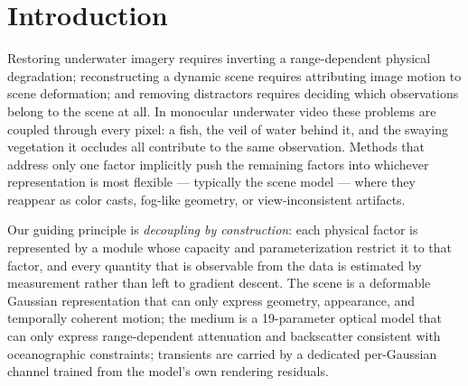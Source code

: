 \documentclass[11pt,a4paper]{article}
\begin{document}
\section{Introduction}

Restoring underwater imagery requires inverting a range-dependent physical degradation; reconstructing a dynamic scene requires attributing image motion to scene deformation; and removing distractors requires deciding which observations belong to the scene at all. In monocular underwater video these problems are coupled through every pixel: a fish, the veil of water behind it, and the swaying vegetation it occludes all contribute to the same observation. Methods that address only one factor implicitly push the remaining factors into whichever representation is most flexible --- typically the scene model \cite{mildenhall2020nerf,kerbl20233d} --- where they reappear as color casts, fog-like geometry, or view-inconsistent artifacts.

Our guiding principle is \emph{decoupling by construction}: each physical factor is represented by a module whose capacity and parameterization restrict it to that factor, and every quantity that is observable from the data is estimated by measurement rather than left to gradient descent. The scene is a deformable Gaussian representation that can only express geometry, appearance, and temporally coherent motion; the medium is a 19-parameter optical model that can only express range-dependent attenuation and backscatter consistent with oceanographic constraints; transients are carried by a dedicated per-Gaussian channel trained from the model's own rendering residuals.
\end{document}
